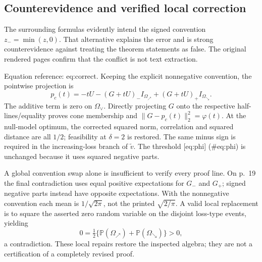 \documentclass[10pt]{article}
\begin{document}
\subsection*{Counterevidence and verified local correction}
The surrounding formulas evidently intend the signed convention \(z_-=\min(z,0)\). That alternative explains the error and is strong counterevidence against treating the theorem statements as false. The original rendered pages confirm that the conflict is not text extraction.\par
Equation reference: eq:correct. Keeping the explicit nonnegative convention, the pointwise projection is \[
p_c(t)=-tU-(G+tU)_-I_{\Omega_\nearrow}
                    +(G+tU)_+I_{\Omega_\searrow}.\] The additive term is zero on \(\Omega_\vee\). Directly projecting \(G\) onto the respective half-lines/equality proves cone membership and \(\|G-p_c(t)\|_2^2=\varphi(t)\). At the null-model optimum, the corrected squared norm, correlation and squared distance are all \(1/2\); feasibility at \(\delta=2\) is restored. The same minus sign is required in the increasing-loss branch of \(\widetilde v\). The threshold [eq:phi] (\#eq:phi) is unchanged because it uses squared negative parts.\par
A global convention swap alone is insufficient to verify every proof line. On p. 19 the final contradiction uses equal positive expectations for \(G_-\) and \(G_+\); signed negative parts instead have opposite expectations. With the nonnegative convention each mean is \(1/\sqrt{2\pi}\), not the printed \(\sqrt{2/\pi}\). A valid local replacement is to square the asserted zero random variable on the disjoint loss-type events, yielding \[0=\tfrac12\{\mathbb P(\Omega_\nearrow)+\mathbb P(\Omega_\searrow)\}>0,\] a contradiction. These local repairs restore the inspected algebra; they are not a certification of a completely revised proof.\par
\end{document}
